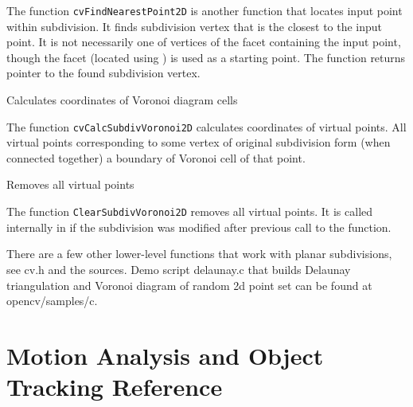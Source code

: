 \begin{description}
\end{description}

The function \texttt{cvFindNearestPoint2D} is another function that
locates input point within subdivision. It finds subdivision vertex that
is the closest to the input point. It is not necessarily one of vertices
of the facet containing the input point, though the facet (located using
) is used as a starting
point. The function returns pointer to the found subdivision vertex.

\label{CalcSubdivVoronoi2D}

Calculates coordinates of Voronoi diagram cells


\begin{description}
\end{description}

The function \texttt{cvCalcSubdivVoronoi2D} calculates coordinates
of virtual points. All virtual points corresponding to some vertex of
original subdivision form (when connected together) a boundary of Voronoi
cell of that point.

\label{ClearSubdivVoronoi2D}

Removes all virtual points


\begin{description}
\end{description}

The function \texttt{ClearSubdivVoronoi2D} removes all virtual points. It
is called internally in  if the subdivision
was modified after previous call to the function.

There are a few other lower-level functions that work with planar
subdivisions, see cv.h and the sources. Demo script delaunay.c that
builds Delaunay triangulation and Voronoi diagram of random 2d point
set can be found at opencv/samples/c.

\section{Motion Analysis and Object Tracking Reference}

